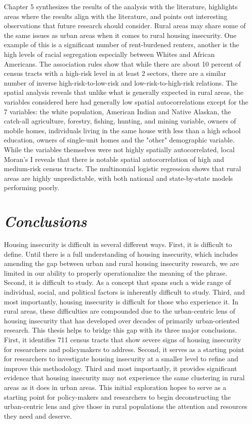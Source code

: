 Chapter 5 synthesizes the results of the analysis with the literature, highlights areas where the results align with the literature, and points out interesting observations that future research should consider. Rural areas may share some of the same issues as urban areas when it comes to rural housing insecurity. One example of this is a significant number of rent-burdened renters, another is the high levels of racial segregation especially between Whites and African Americans. The association rules show that while there are about 10 percent of census tracts with a high-risk level in at least 2 sectors, there are a similar number of inverse high-risk-to-low-risk and low-risk-to-high-risk relations. The spatial analysis reveals that unlike what is generally expected in rural areas, the variables considered here had generally low spatial autocorrelations except for the 7 variables: the white population, American Indian and Native Alaskan, the catch-all agriculture, forestry, fishing, hunting, and mining variable, owners of mobile homes, individuals living in the same house with less than a high school education, owners of single-unit homes and the "other" demographic variable. While the variables themselves were not highly spatially autocorrelated, local Moran's I reveals that there is notable spatial autocorrelation of high and medium-risk census tracts. The multinomial logistic regression shows that rural areas are highly unpredictable, with both national and state-by-state models performing poorly. 


\section{\textit{Conclusions}}

Housing insecurity is difficult in several different ways. First, it is difficult to define. Until there is a full understanding of housing insecurity, which includes amending the gap between urban and rural housing insecurity research, we are limited in our ability to properly operationalize the meaning of the phrase. Second, it is difficult to study. As a concept that spans such a wide range of individual, social, and political factors is inherently difficult to study. Third, and most importantly, housing insecurity is difficult for those who experience it. In rural areas, these difficulties are compounded due to the urban-centric lens of housing insecurity that has developed over decades of primarily urban-oriented research. This thesis helps to bridge this gap with its three major conclusions. First, it identifies 711 census tracts that show severe signs of housing insecurity for researchers and policymakers to address. Second, it serves as a starting point for researchers to investigate housing insecurity at a smaller level to refine and improve this methodology. Third and most importantly, it provides significant evidence that housing insecurity may not experience the same clustering in rural areas as it does in urban areas. This initial exploration hopes to serve as a starting point for policy-makers and researchers to begin deconstructing the urban-centric lens and give those in rural populations the attention and resources they need and deserve. 

